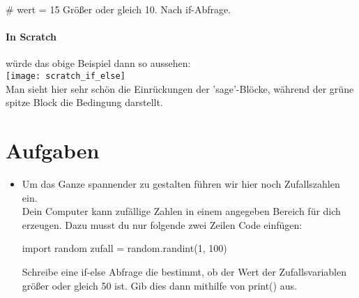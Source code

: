 \documentclass{\VorlagenPfad/coderdojokatext}
\begin{document}
\begin{pseudocode}
# wert = 15
Größer oder gleich 10.
Nach if-Abfrage.
\end{pseudocode}

\paragraph{In Scratch} würde das obige Beispiel dann so aussehen:
\\
\texttt{[image: scratch\_if\_else]}
\\
Man sieht hier sehr schön die Einrückungen der 'sage'-Blöcke, während der grüne spitze Block die Bedingung darstellt.


\section{Aufgaben}
\begin{itemize}
\item Um das Ganze spannender zu gestalten führen wir hier noch Zufallszahlen ein.\\
Dein Computer kann zufällige Zahlen in einem angegeben Bereich für dich erzeugen.
Dazu musst du nur folgende zwei Zeilen Code einfügen:
\begin{pythoncode}
import random
zufall = random.randint(1, 100)
\end{pythoncode}
Schreibe eine if-else Abfrage die bestimmt, ob der Wert der Zufallsvariablen größer oder gleich 50 ist. Gib dies dann mithilfe von print() aus.
\end{itemize}
\end{document}
